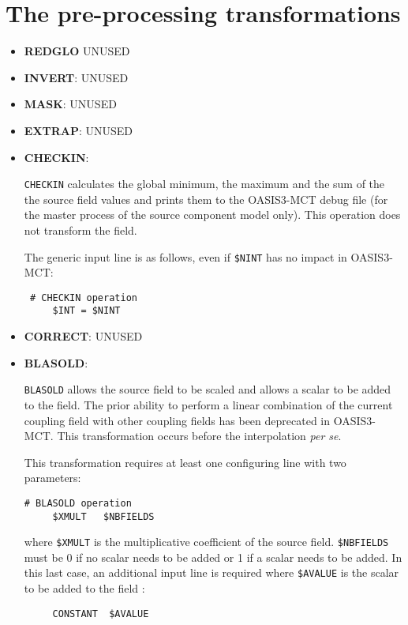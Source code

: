 \section{The pre-processing transformations}
\label{subsec_preproc}

\begin{itemize}

\item {\bf REDGLO} UNUSED

\item {\bf INVERT}: UNUSED

\item {\bf MASK}: UNUSED
 
\item {\bf EXTRAP}: UNUSED

\item {\bf CHECKIN}:

 {\tt CHECKIN} calculates the global minimum, the maximum and the sum of the
 the source field values and prints them to the OASIS3-MCT debug file (for the master process of the source component model only). This operation does not transform the field.

 The generic input line is as follows, even if {\tt \$NINT} has no impact in OASIS3-MCT:
 \begin{verbatim}
 # CHECKIN operation
     $INT = $NINT  
 \end{verbatim} 

\item {\bf CORRECT}: UNUSED

\item {\bf BLASOLD}: 

{\tt BLASOLD} allows the source field to be scaled and allows
a scalar to be added to the field.  The prior ability to perform 
a linear combination of the current coupling field with other coupling fields 
has been deprecated in OASIS3-MCT.  This transformation occurs before the interpolation {\it per se}.

This transformation requires at least one configuring line with two
parameters:
 \begin{verbatim}
# BLASOLD operation
     $XMULT   $NBFIELDS 
 \end{verbatim}
\vspace{-0.5cm}  
where {\tt \$XMULT} is the multiplicative coefficient of the source
field. {\tt \$NBFIELDS} must be 0 if no scalar needs to be added or 1
if a scalar needs to be added. In this last case, an additional input
line is required where {\tt \$AVALUE} is the scalar to be added to the
field :
\begin{verbatim}
     CONSTANT  $AVALUE
\end{verbatim} 
\end{itemize}

